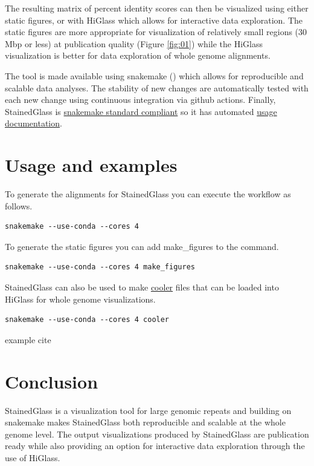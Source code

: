 \documentclass{bioinfo}
\begin{document}
The resulting matrix of percent identity scores can then be visualized using
either static figures, or with HiGlass which allows for interactive data
exploration. The static figures are more appropriate for visualization of 
relatively small regions (30 Mbp or less) at publication quality (Figure \ref{fig:01}) while the
HiGlass visualization is better for data exploration of whole genome alignments.

The tool is made available using snakemake (\citealp{Koster2012-fs,Koster2018-ef,Molder2021-xm}) which allows for reproducible and
scalable data analyses. The stability of new changes are automatically tested
with each new change using continuous integration via github actions. Finally,
StainedGlass is
\href{https://snakemake.github.io/snakemake-workflow-catalog?rules=true}{snakemake
standard compliant} so it has automated
\href{https://snakemake.github.io/snakemake-workflow-catalog?usage=mrvollger/StainedGlass}{usage
documentation}.

\section{Usage and examples}
To generate the alignments for StainedGlass you can execute the workflow as follows. 
\begin{lstlisting}
snakemake --use-conda --cores 4 
\end{lstlisting}
To generate the static figures you can add make\_figures to the command. 
\begin{lstlisting}
snakemake --use-conda --cores 4 make_figures
\end{lstlisting}
StainedGlass can also be used to make \href{https://github.com/open2c/cooler}{cooler} files that can be loaded into HiGlass for whole genome visualizations. 
\begin{lstlisting}
snakemake --use-conda --cores 4 cooler
\end{lstlisting}
\cite{Logsdon2021-zr} example cite

\section{Conclusion}

StainedGlass is a visualization tool for large genomic repeats and building on
snakemake makes StainedGlass both reproducible and scalable at the whole genome
level. The output visualizations produced by StainedGlass are publication ready
while also providing an option for interactive data exploration through the use
of HiGlass.
\end{document}
